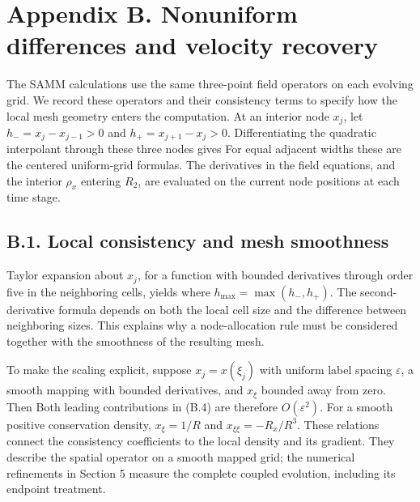 \FloatBarrier
\section*{Appendix B. Nonuniform differences and velocity recovery}
\label{app:stencils}

The SAMM calculations use the same three-point field operators on each evolving grid. We record these operators and their consistency terms to specify how the local mesh geometry enters the computation. At an interior node \(x_j\), let \(h_-=x_j-x_{j-1}>0\) and \(h_+=x_{j+1}-x_j>0\). Differentiating the quadratic interpolant through these three nodes gives
For equal adjacent widths these are the centered uniform-grid formulas. The derivatives in the field equations, and the interior \(\rho_x\) entering \(R_2\), are evaluated on the current node positions at each time stage.

\subsection*{B.1. Local consistency and mesh smoothness}

Taylor expansion about \(x_j\), for a function with bounded derivatives through order five in the neighboring cells, yields
where \(h_{\max}=\max(h_-,h_+)\). The second-derivative formula depends on both the local cell size and the difference between neighboring sizes. This explains why a node-allocation rule must be considered together with the smoothness of the resulting mesh.

To make the scaling explicit, suppose \(x_j=x(\xi_j)\) with uniform label spacing \(\varepsilon\), a smooth mapping with bounded derivatives, and \(x_\xi\) bounded away from zero. Then
Both leading contributions in (B.4) are therefore \(O(\varepsilon^2)\). For a smooth positive conservation density, \(x_\xi=1/R\) and \(x_{\xi\xi}=-R_x/R^3\). These relations connect the consistency coefficients to the local density and its gradient. They describe the spatial operator on a smooth mapped grid; the numerical refinements in Section 5 measure the complete coupled evolution, including its endpoint treatment.

